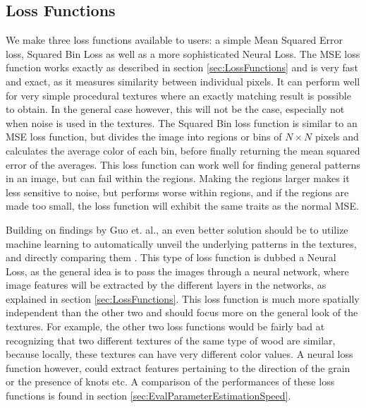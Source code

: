 \subsection{Loss Functions}\label{sec:MethodLossFunctions}

We make three loss functions available to users: a simple Mean Squared Error loss, Squared Bin Loss as well as a more sophisticated Neural Loss. The MSE loss function works exactly as described in section \ref{sec:LossFunctions} and is very fast and exact, as it measures similarity between individual pixels. It can perform well for very simple procedural textures where an exactly matching result is possible to obtain. In the general case however, this will not be the case, especially not when noise is used in the textures. The Squared Bin loss function is similar to an MSE loss function, but divides the image into regions or bins of $N\times N$ pixels and calculates the average color of each bin, before finally returning the mean squared error of the averages. This loss function can work well for finding general patterns in an image, but can fail within the regions. Making the regions larger makes it less sensitive to noise, but performs worse within regions, and if the regions are made too small, the loss function will exhibit the same traits as the normal MSE. 

Building on findings by Guo et. al., an even better solution should be to utilize machine learning to automatically unveil the underlying patterns in the textures, and directly comparing them \cite{guo_2019_a}. This type of loss function is dubbed a Neural Loss, as the general idea is to pass the images through a neural network, where image features will be extracted by the different layers in the networks, as explained in section \ref{sec:LossFunctions}. This loss function is much more spatially independent than the other two and should focus more on the general look of the textures. For example, the other two loss functions would be fairly bad at recognizing that two different textures of the same type of wood are similar, because locally, these textures can have very different color values. A neural loss function however, could extract features pertaining to the direction of the grain or the presence of knots etc. A comparison of the performances of these loss functions is found in section \ref{sec:EvalParameterEstimationSpeed}.

